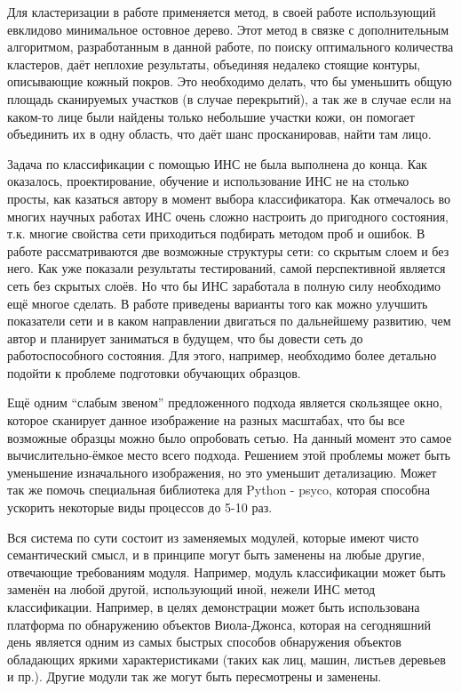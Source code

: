 \documentclass[12pt]{report}
\begin{document}
Для кластеризации в работе применяется метод, в своей работе использующий евклидово минимальное остовное дерево. 
Этот метод в связке с дополнительным алгоритмом, разработанным в данной работе, по поиску оптимального количества 
кластеров, даёт неплохие результаты, объединяя недалеко стоящие контуры, описывающие кожный покров. Это необходимо делать, что бы уменьшить общую площадь сканируемых участков (в случае перекрытий), а так же в случае если на каком-то лице были найдены только небольшие участки кожи, он помогает объединить их в одну область, что даёт шанс просканировав, найти там лицо.

Задача по классификации с помощью ИНС не была выполнена до конца. Как оказалось, проектирование, обучение и 
использование ИНС не на столько просты, как казаться автору в момент выбора классификатора. Как отмечалось во многих научных работах ИНС очень сложно настроить до пригодного состояния, т.к. многие свойства сети приходиться подбирать  
методом проб и ошибок. В работе рассматриваются две возможные структуры сети: со скрытым слоем и без него. Как уже 
показали результаты тестирований, самой перспективной является сеть без скрытых слоёв. Но что бы ИНС заработала в 
полную силу необходимо ещё многое сделать. В работе приведены варианты того как можно улучшить показатели сети и в 
каком направлении двигаться по дальнейшему развитию, чем автор и планирует заниматься в будущем, что бы довести 
сеть до работоспособного состояния. Для этого, например, необходимо более детально подойти к проблеме подготовки 
обучающих образцов.

Ещё одним ``слабым звеном'' предложенного подхода является скользящее окно, которое сканирует данное изображение на 
разных масштабах, что бы все возможные образцы можно было опробовать сетью. На данный момент это самое 
вычислительно-ёмкое место всего подхода. Решением этой проблемы может быть уменьшение изначального изображения, но 
это уменьшит детализацию. Может так же помочь специальная библиотека для Python - psyco, которая способна ускорить 
некоторые виды процессов до 5-10 раз.

Вся система по сути состоит из заменяемых модулей, которые имеют чисто семантический смысл, и в принципе могут быть 
заменены на любые другие, отвечающие требованиям модуля. Например, модуль классификации может быть заменён на любой 
другой, использующий иной, нежели ИНС метод классификации. Например, в целях демонстрации может быть использована 
платформа по обнаружению объектов Виола-Джонса, которая на сегодняшний день является одним из самых быстрых 
способов обнаружения объектов обладающих яркими характеристиками (таких как лиц, машин, листьев деревьев и пр.). Другие модули так же могут быть пересмотрены и заменены.
\end{document}
